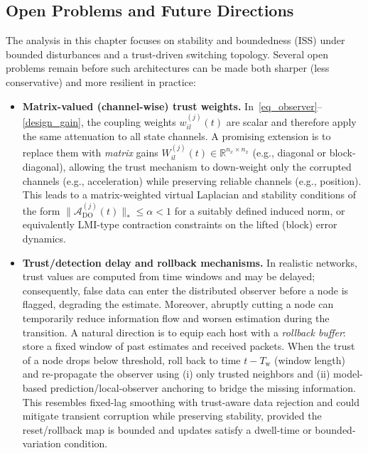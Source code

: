 \subsection{Open Problems and Future Directions}
\vspace*{-0.2cm}
The analysis in this chapter focuses on stability and boundedness (ISS) under bounded disturbances and a trust-driven switching topology. Several open problems remain before such architectures can be made both sharper (less conservative) and more resilient in practice:
\begin{itemize}
    \item \textbf{Matrix-valued (channel-wise) trust weights.}
    In~\eqref{eq_observer}--\eqref{design_gain}, the coupling weights $w_{il}^{(j)}(t)$ are scalar and therefore apply the same attenuation to all state channels. A promising extension is to replace them with \emph{matrix} gains $W_{il}^{(j)}(t)\in\mathbb{R}^{n_x\times n_x}$ (e.g., diagonal or block-diagonal), allowing the trust mechanism to down-weight only the corrupted channels (e.g., acceleration) while preserving reliable channels (e.g., position). This leads to a matrix-weighted virtual Laplacian and stability conditions of the form
    $\|\mathcal{A}_{\mathrm{DO}}^{(j)}(t)\|_*\le \alpha<1$ for a suitably defined induced norm, or equivalently LMI-type contraction constraints on the lifted (block) error dynamics.

    \item \textbf{Trust/detection delay and rollback mechanisms.}
    In realistic networks, trust values are computed from time windows and may be delayed; consequently, false data can enter the distributed observer before a node is flagged, degrading the estimate. Moreover, abruptly cutting a node can temporarily reduce information flow and worsen estimation during the transition.
    A natural direction is to equip each host with a \emph{rollback buffer}: store a fixed window of past estimates and received packets. When the trust of a node drops below threshold, roll back to time $t-T_{\mathrm{w}}$ (window length) and re-propagate the observer using (i) only trusted neighbors and (ii) model-based prediction/local-observer anchoring to bridge the missing information. This resembles fixed-lag smoothing with trust-aware data rejection and could mitigate transient corruption while preserving stability, provided the reset/rollback map is bounded and updates satisfy a dwell-time or bounded-variation condition.


\end{itemize}
